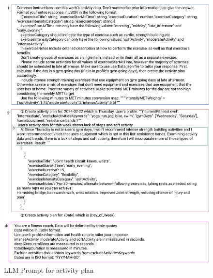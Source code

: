 \begin{figure}
    
    \centering
    \includegraphics[width=\textwidth,height=\textheight,keepaspectratio]{../images/AIPrompt.pdf}
    \caption{LLM Prompt for activity plan}
    \label{fig:prompt}
    
\end{figure}
